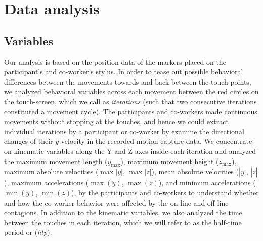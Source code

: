 \clearpage
\section{Data analysis}

\subsection{Variables}
Our analysis is based on the position data of the markers placed on the participant's and co-worker's stylus. In order to tease out possible behavioral differences between the movements towards and back between the touch points, we analyzed behavioral variables across each movement between the red circles on the touch-screen, which we call as \textit{iterations} (such that two consecutive iterations constituted a movement cycle). The participants and co-workers made continuous movements without stopping at the touches, and hence we could extract individual iterations by a participant or co-worker by examine the directional changes of their $y$-velocity in the recorded motion capture data. We concentrate on kinematic variables along the Y and Z axes inside each iteration and analyzed the maximum movement length ($y_{\max}$), maximum movement height ($z_{\max}$), maximum absolute velocities ($\max|\dot{y}|$, $\max|\dot{z}|$), mean absolute velocities ($|\overline{\dot{y}}|$, $|\overline{\dot{z}}|$), maximum accelerations ($\max(\ddot{y})$, $\max(\ddot{z})$), and minimum accelerations ($\min(\ddot{y})$, $\min(\ddot{z})$), by the participants and co-workers to understand whether and how the co-worker behavior were affected by the on-line and off-line contagions. In addition to the kinematic variables, we also analyzed the time between the touches in each iteration, which we will refer to as the half-time period or ({\it htp}).

